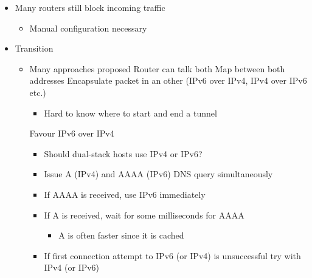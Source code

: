 \begin{itemize}
    \item Many routers still block incoming traffic
        \begin{itemize}
            \item Manual configuration necessary
        \end{itemize}
    \item Transition
        \begin{itemize}
            \item Many approaches proposed
                 Router can talk both
                 Map between both addresses
                 Encapsulate packet in an other (IPv6 over IPv4, IPv4 over IPv6 etc.)
                    \begin{itemize}
                        \item Hard to know where to start and end a tunnel
                    \end{itemize}
                 Favour IPv6 over IPv4
                \begin{itemize}
                    \item Should dual-stack hosts use IPv4 or IPv6?
                    \item Issue A (IPv4) and AAAA (IPv6) DNS query simultaneously
                    \item If AAAA is received, use IPv6 immediately
                    \item If A is received, wait for some milliseconds for AAAA
                        \begin{itemize}
                            \item A is often faster since it is cached
                        \end{itemize}
                    \item If first connection attempt to IPv6 (or IPv4) is unsuccessful try with IPv4 (or IPv6)
                \end{itemize}
        \end{itemize}
\end{itemize}



